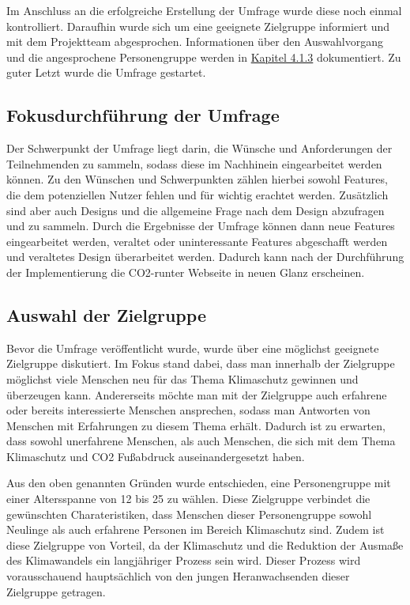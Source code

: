 Im Anschluss an die erfolgreiche Erstellung der Umfrage wurde diese noch einmal kontrolliert.
Daraufhin wurde sich um eine geeignete Zielgruppe informiert und mit dem Projektteam abgesprochen.
Informationen über den Auswahlvorgang und die angesprochene Personengruppe werden in \hyperref[subsec:auswahl-der-zielgruppe]{Kapitel 4.1.3} dokumentiert.
Zu guter Letzt wurde die Umfrage gestartet.

\subsection{Fokusdurchführung der Umfrage}
Der Schwerpunkt der Umfrage liegt darin, die Wünsche und Anforderungen der Teilnehmenden zu sammeln, sodass diese im Nachhinein eingearbeitet werden können.
Zu den Wünschen und Schwerpunkten zählen hierbei sowohl Features, die dem potenziellen Nutzer fehlen und für wichtig erachtet werden.
Zusätzlich sind aber auch Designs und die allgemeine Frage nach dem Design abzufragen und zu sammeln.
Durch die Ergebnisse der Umfrage können dann neue Features eingearbeitet werden, veraltet oder uninteressante Features abgeschafft werden und veraltetes Design überarbeitet werden.
Dadurch kann nach der Durchführung der Implementierung die CO2-runter Webseite in neuen Glanz erscheinen.

\subsection{Auswahl der Zielgruppe}
\label{subsec:auswahl-der-zielgruppe}
Bevor die Umfrage veröffentlicht wurde, wurde über eine möglichst geeignete Zielgruppe diskutiert.
Im Fokus stand dabei, dass man innerhalb der Zielgruppe möglichst viele Menschen neu für das Thema Klimaschutz gewinnen und überzeugen kann.
Andererseits möchte man mit der Zielgruppe auch erfahrene oder bereits interessierte Menschen ansprechen, sodass man Antworten von Menschen mit Erfahrungen zu diesem Thema erhält.
Dadurch ist zu erwarten, dass sowohl unerfahrene Menschen, als auch Menschen, die sich mit dem Thema Klimaschutz und CO2 Fußabdruck auseinandergesetzt haben.

Aus den oben genannten Gründen wurde entschieden, eine Personengruppe mit einer Altersspanne von 12 bis 25 zu wählen.
Diese Zielgruppe verbindet die gewünschten Charateristiken, dass Menschen dieser Personengruppe sowohl Neulinge als auch erfahrene Personen im Bereich Klimaschutz sind.
Zudem ist diese Zielgruppe von Vorteil, da der Klimaschutz und die Reduktion der Ausmaße des Klimawandels ein langjähriger Prozess sein wird.
Dieser Prozess wird vorausschauend hauptsächlich von den jungen Heranwachsenden dieser Zielgruppe getragen.

